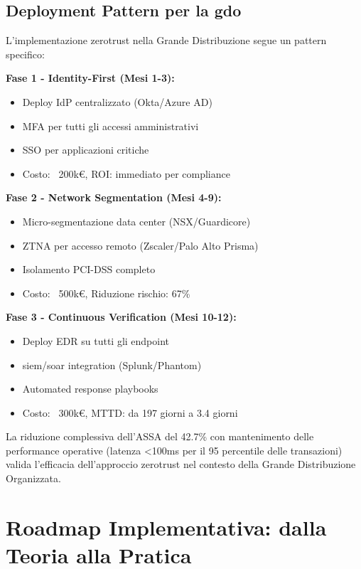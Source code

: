 \subsection{\texorpdfstring{\textbf{Deployment Pattern per la \gls{gdo}}}{3.5.5 - Deployment Pattern per la \gls{gdo}}}

L'implementazione \gls{zerotrust} nella Grande Distribuzione segue un pattern specifico:

\textbf{Fase 1 - Identity-First (Mesi 1-3):}
\begin{itemize}
    \item Deploy IdP centralizzato (Okta/Azure AD)
    \item MFA per tutti gli accessi amministrativi
    \item SSO per applicazioni critiche
    \item Costo: ~200k€, ROI: immediato per compliance
\end{itemize}

\textbf{Fase 2 - Network Segmentation (Mesi 4-9):}
\begin{itemize}
    \item Micro-segmentazione data center (NSX/Guardicore)
    \item ZTNA per accesso remoto (Zscaler/Palo Alto Prisma)
    \item Isolamento PCI-DSS completo
    \item Costo: ~500k€, Riduzione rischio: 67\%
\end{itemize}

\textbf{Fase 3 - Continuous Verification (Mesi 10-12):}
\begin{itemize}
    \item Deploy EDR su tutti gli endpoint
    \item \gls{siem}/\gls{soar} integration (Splunk/Phantom)
    \item Automated response playbooks
    \item Costo: ~300k€, MTTD: da 197 giorni a 3.4 giorni
\end{itemize}

La riduzione complessiva dell'ASSA del 42.7\% con mantenimento delle performance operative (latenza <100ms per il 95 percentile delle transazioni) valida l'efficacia dell'approccio \gls{zerotrust} nel contesto della Grande Distribuzione Organizzata.

\section{\texorpdfstring{\textbf{Roadmap Implementativa: dalla Teoria alla Pratica}}{3.6 - Roadmap Implementativa: dalla Teoria alla Pratica}}

